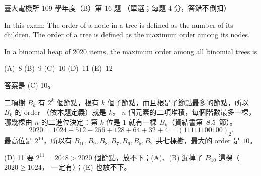 \begin{pastexam}[label={px:ntu-109-ee-ds-16}]{臺大電機所 109 學年度（B）第 16 題}
（單選；每題 4 分，答錯不倒扣）

In this exam: The order of a node in a tree is defined as the number of its children. The order of
a tree is defined as the maximum order among its nodes.

In a binomial heap of 2020 items, the maximum order among all binomial trees is

(A)~8 \qquad (B)~9 \qquad (C)~10 \qquad (D)~11 \qquad (E)~12
\end{pastexam}

\begin{pastsoln}
答案是 (C) 10。

二項樹 $B_k$ 有 $2^k$ 個節點，根有 $k$ 個子節點，而且根是子節點最多的節點，所以 $B_k$ 的 order
（依本題定義）就是 $k$。 $n$ 個元素的二項堆積，每個階數最多一棵，哪幾棵由 $n$ 的二進位決定：第 $k$
位是 $1$ 就有一棵 $B_k$（資結書第~8.5~節）。
\[
2020 = 1024 + 512 + 256 + 128 + 64 + 32 + 4 = (11111100100)_2 .
\]
最高位是 $2^{10}$，所以有 $B_{10}, B_9, B_8, B_7, B_6, B_5, B_2$ 共七棵樹，最大的 order 是 $10$。

(D) 11 要 $2^{11} = 2048 > 2020$ 個節點，放不下；(A)、(B) 漏掉了 $B_{10}$ 這棵（$2020 \ge 1024$，
一定有）；(E) 也放不下。
\end{pastsoln}
